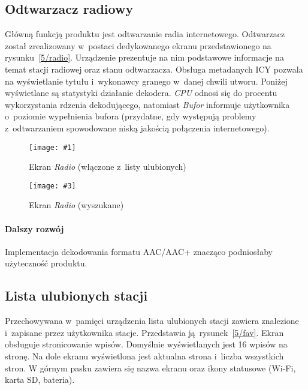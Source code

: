 \documentclass[polish]{aghengthesis}
\newcommand{\imgintss}[5]{
	\begin{figure}[{#5}]
		\centering
		\begin{minipage}{.45\textwidth}
			\centering
			\texttt{[image: \#1]}
			\caption{#2}
			\label{#1}
		\end{minipage}%
		\hfill
		\begin{minipage}{.45\textwidth}
			\centering
			\texttt{[image: \#3]}
			\caption{#4}
			\label{#3}
		\end{minipage}
	\end{figure}
}
\newcommand{\imghss}[4]{\imgintss{#1}{#2}{#3}{#4}{H}}
\begin{document}
		\subsection{Odtwarzacz radiowy}			
			Główną funkcją produktu jest odtwarzanie radia internetowego. Odtwarzacz został zrealizowany w~postaci dedykowanego ekranu przedstawionego na rysunku~\ref{5/radio}. Urządzenie prezentuje na nim podstawowe informacje na temat stacji radiowej oraz stanu odtwarzacza. Obsługa metadanych ICY pozwala na wyświetlanie tytułu i~wykonawcy granego w~danej chwili utworu. Poniżej wyświetlane są statystyki działanie dekodera. \textit{CPU} odnosi się do procentu wykorzystania rdzenia dekodującego, natomiast \textit{Bufor} informuje użytkownika o~poziomie wypełnienia bufora (przydatne, gdy występują problemy z~odtwarzaniem spowodowane niską jakością połączenia internetowego).
			
			\imghss{5/radio}{Ekran \textit{Radio} (włączone z~listy ulubionych)}{5/radio_search}{Ekran \textit{Radio} (wyszukane)}
			
		
			\paragraph{Dalszy rozwój}
				Implementacja dekodowania formatu AAC/AAC+ znacząco podniosłaby użyteczność produktu.
			
		\subsection{Lista ulubionych stacji}
			Przechowywana w~pamięci urządzenia lista ulubionych stacji zawiera znalezione i~zapisane przez użytkownika stacje. Przedstawia ją rysunek~\ref{5/fav}.
			Ekran obsługuje stronicowanie wpisów. Domyślnie wyświetlanych jest 16 wpisów na stronę. Na dole ekranu wyświetlona jest aktualna strona i~liczba wszystkich stron.
			W górnym pasku zawiera się nazwa ekranu oraz ikony statusowe (Wi-Fi, karta SD, bateria).
			
\end{document}

